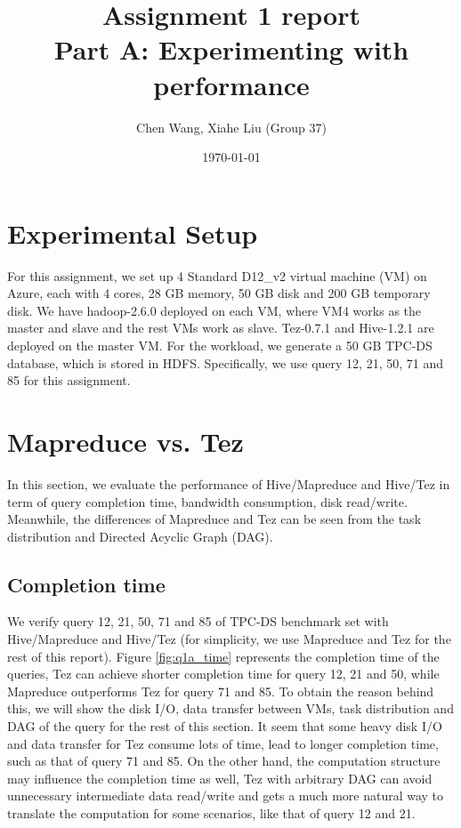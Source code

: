 \documentclass[10pt]{article}
\title{Assignment 1 report \\ Part A: Experimenting with performance} %
\author{Chen Wang, Xiahe Liu (Group 37)} %
\date{\today} %
\begin{document}
\maketitle %




\section{Experimental Setup}

For this assignment, we set up 4 Standard D12\_v2 virtual machine (VM) on Azure, each with 4 cores, 28 GB memory, 50 GB disk and 200 GB temporary disk. We have hadoop-2.6.0 deployed on each VM, where VM4 works as the master and slave and the rest VMs work as slave. Tez-0.7.1 and Hive-1.2.1 are deployed on the master VM. For the workload, we generate a 50 GB TPC-DS database, which is stored in HDFS. Specifically, we use query 12, 21, 50, 71 and 85 for this assignment. 


\section{Mapreduce vs. Tez}
In this section, we evaluate the performance of Hive/Mapreduce and Hive/Tez in term of query completion time, bandwidth consumption, disk read/write. Meanwhile, the differences of Mapreduce and Tez can be seen from the task distribution and Directed Acyclic Graph (DAG).

\subsection{Completion time}
We verify query 12, 21, 50, 71 and 85 of TPC-DS benchmark set with Hive/Mapreduce and Hive/Tez (for simplicity, we use Mapreduce and Tez for the rest of this report). Figure \ref{fig:q1a_time} represents the completion time of the queries, Tez can achieve shorter completion time for query 12, 21 and 50, while Mapreduce outperforms Tez for query 71 and 85. To obtain the reason behind this, we will show the disk I/O, data transfer between VMs, task distribution and DAG of the query for the rest of this section. It seem that some heavy disk I/O and data transfer for Tez consume lots of time, lead to longer completion time, such as that of query 71 and 85. On the other hand, the computation structure may influence the completion time as well, Tez with arbitrary DAG can avoid unnecessary intermediate data read/write and gets a much more natural way to translate the computation for some scenarios, like that of query 12 and 21.
\end{document}
